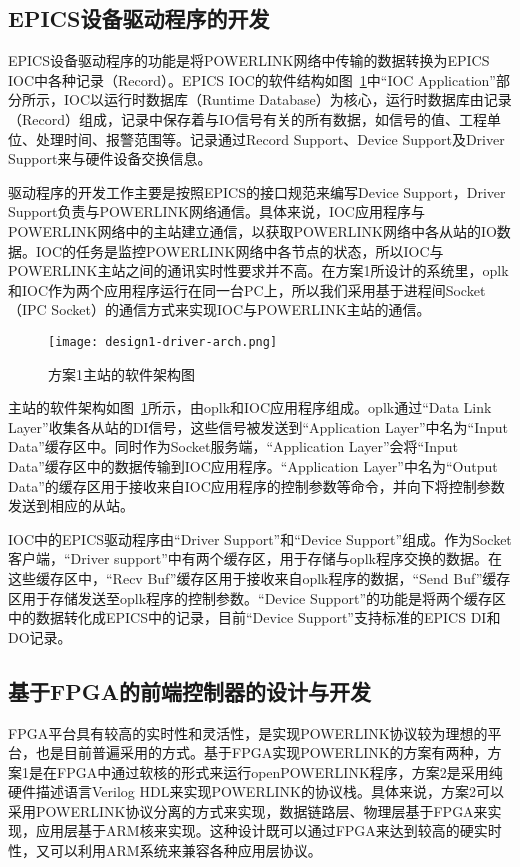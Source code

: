 \subsection{EPICS设备驱动程序的开发}

EPICS设备驱动程序的功能是将POWERLINK网络中传输的数据转换为EPICS IOC中各种记录（Record）。EPICS IOC的软件结构如图~\ref{fig:design1-driver-arch}中“IOC Application”部分所示，IOC以运行时数据库（Runtime Database）为核心，运行时数据库由记录（Record）组成，记录中保存着与IO信号有关的所有数据，如信号的值、工程单位、处理时间、报警范围等。记录通过Record Support、Device Support及Driver Support来与硬件设备交换信息。

驱动程序的开发工作主要是按照EPICS的接口规范来编写Device Support，Driver Support负责与POWERLINK网络通信。具体来说，IOC应用程序与POWERLINK网络中的主站建立通信，以获取POWERLINK网络中各从站的IO数据。IOC的任务是监控POWERLINK网络中各节点的状态，所以IOC与POWERLINK主站之间的通讯实时性要求并不高。在方案1所设计的系统里，oplk和IOC作为两个应用程序运行在同一台PC上，所以我们采用基于进程间Socket（IPC Socket）的通信方式来实现IOC与POWERLINK主站的通信。

\begin{figure}[!htb]
  \centering
  \texttt{[image: design1-driver-arch.png]}
  \caption{方案1主站的软件架构图}
  \label{fig:design1-driver-arch}
\end{figure}

主站的软件架构如图~\ref{fig:design1-driver-arch}所示，由oplk和IOC应用程序组成。oplk通过“Data Link Layer”收集各从站的DI信号，这些信号被发送到“Application Layer”中名为“Input Data”缓存区中。同时作为Socket服务端，“Application Layer”会将“Input Data”缓存区中的数据传输到IOC应用程序。“Application Layer”中名为“Output Data”的缓存区用于接收来自IOC应用程序的控制参数等命令，并向下将控制参数发送到相应的从站。

IOC中的EPICS驱动程序由“Driver Support”和“Device Support”组成。作为Socket客户端，“Driver support”中有两个缓存区，用于存储与oplk程序交换的数据。在这些缓存区中，“Recv Buf”缓存区用于接收来自oplk程序的数据，“Send Buf”缓存区用于存储发送至oplk程序的控制参数。“Device Support”的功能是将两个缓存区中的数据转化成EPICS中的记录，目前“Device Support”支持标准的EPICS DI和DO记录。

\subsection{基于FPGA的前端控制器的设计与开发}

FPGA平台具有较高的实时性和灵活性，是实现POWERLINK协议较为理想的平台，也是目前普遍采用的方式。基于FPGA实现POWERLINK的方案有两种，方案1是在FPGA中通过软核的形式来运行openPOWERLINK程序，方案2是采用纯硬件描述语言Verilog HDL来实现POWERLINK的协议栈。具体来说，方案2可以采用POWERLINK协议分离的方式来实现，数据链路层、物理层基于FPGA来实现，应用层基于ARM核来实现。这种设计既可以通过FPGA来达到较高的硬实时性，又可以利用ARM系统来兼容各种应用层协议。


